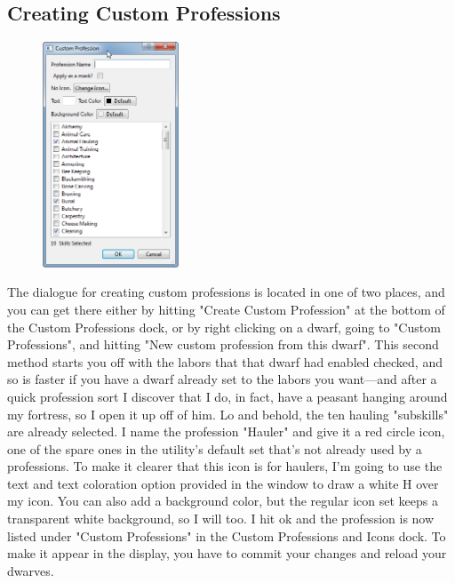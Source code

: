 \documentclass[]{article}
\begin{document}
\subsection{Creating Custom Professions}
\label{sec:Creating Custom Professions}
\begin{figure}
\vspace{-20pt}
  \begin{center}
    \includegraphics[width=0.36\textwidth]{Sec3Fig10}
  \end{center}
\vspace{-15pt}
\end{figure}
The dialogue for creating custom professions is located in one of two places, and you can get there
either by hitting "Create Custom Profession" at the bottom of the Custom Professions dock, or by right
clicking on a dwarf, going to "Custom Professions", and hitting "New custom profession from this dwarf".
This second method starts you off with the labors that that dwarf had enabled checked, and so is faster
if you have a dwarf already set to the labors you want---and after a quick profession sort I discover
that I do, in fact, have a peasant hanging around my fortress, so I open it up off of him. Lo and behold,
the ten hauling "subskills" are already selected. I name the profession "Hauler" and give it a red circle
icon, one of the spare ones in the utility's default set that's not already used by a professions. To
make it clearer that this icon is for haulers, I'm going to use the text and text coloration option
provided in the window to draw a white H over my icon. You can also add a background color, but the
regular icon set keeps a transparent white background, so I will too. I hit ok and the profession is now
listed under "Custom Professions" in the Custom Professions and Icons dock. To make it appear in the
display, you have to commit your changes and reload your dwarves.
\end{document}
